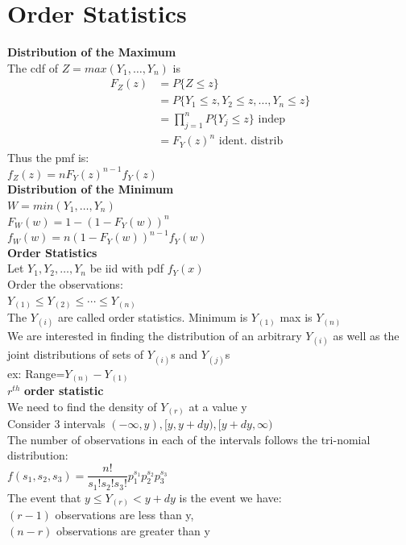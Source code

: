 \documentclass[openany]{book}
\begin{document}
\section{Order Statistics}
\textbf{Distribution of the Maximum}\\
The cdf of $Z=max(Y_1,\dots,Y_n)$ is\\
\begin{align*}
F_Z(z)&= P\{Z\leq z \}\\
&=P\{Y_1\leq z, Y_2 \leq z,\dots, Y_n \leq z \}\\
&=\prod_{j=1}^{n}P\{Y_j\leq z \} \text{ indep}\\
&=F_Y(z)^n \text{ ident. distrib}
\end{align*}
Thus the pmf is:\\
$f_Z(z)=nF_Y(z)^{n-1}f_Y(z)$\\
\textbf{Distribution of the Minimum}\\
$W=min(Y_1,\dots,Y_n)$\\
$F_W(w)=1-(1-F_Y(w))^n$\\
$f_W(w)=n(1-F_Y(w))^{n-1}f_Y(w)$\\
\textbf{Order Statistics}\\
Let $Y_1,Y_2,\dots, Y_n$ be iid with pdf $f_Y(x)$\\
Order the observations:\\
$Y_{(1)}\leq Y_{(2)}\leq \cdots \leq Y_{(n)}$\\
The $Y_{(i)}$ are called order statistics. Minimum is $Y_{(1)}$ max is $Y_{(n)}$\\
We are interested in finding the distribution of an arbitrary $Y_{(i)}$ as well as the joint distributions of sets of $Y_{(i)}$s and $Y_{(j)}$s\\
ex: Range=$Y_{(n)}-Y_{(1)}$\\
$r^{th}$\textbf{ order statistic}\\
We need to find the density of $Y_{(r)}$ at a value y\\
Consider 3 intervals $(-\infty,y),[y,y+dy),[y+dy,\infty)$\\
The number of observations in each of the intervals follows the tri-nomial distribution:\\
$f(s_1,s_2,s_3)=\dfrac{n!}{s_1!s_2!s_3!}p_1^{s_1}p_2^{s_2}p_3^{s_3}$\\
The event that $y\leq Y_{(r)}<y+dy$ is the event we have:\\
$(r-1)$ observations are less than y,\\
$(n-r)$ observations are greater than y\\
\end{document}
